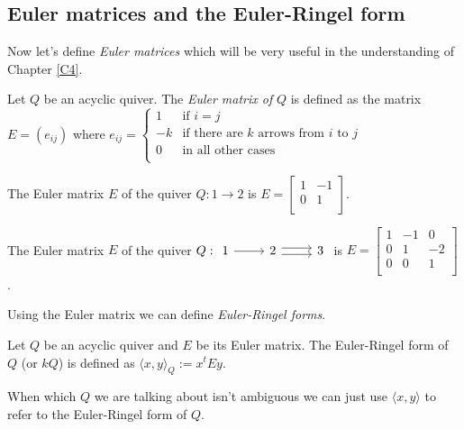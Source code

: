 \subsection{Euler matrices and the Euler-Ringel form}
\indent Now let's define \textit{Euler matrices} which will be very useful in the understanding of Chapter \ref{C4}.\\
\begin{definition}
Let $Q$ be an acyclic quiver. The \textit{Euler matrix of } $Q$ is defined as the matrix $E = (e_{ij})$ where $e_{ij} = \begin{cases}
1 & \text{if } i=j\\
-k & \text{if there are }k\text{ arrows from }i\text{ to }j\\
0 & \text{in all other cases}\\
\end{cases}$
\end{definition}
\begin{example}
The Euler matrix $E$ of the quiver $Q:1\to 2$ is $E=\begin{bmatrix}1 & -1\\0 & 1\\\end{bmatrix}$.
\end{example}
\begin{example}
The Euler matrix $E$ of the quiver $Q:\begin{tikzcd}1\arrow[r] & 2\rightdoublearrow & 3\end{tikzcd}$ is $E=\begin{bmatrix}1 & -1 & 0\\0 & 1 & -2 \\0 & 0 & 1\\\end{bmatrix}$.
\end{example}
\indent Using the Euler matrix we can define \textit{Euler-Ringel forms}.\\
\begin{definition}
Let $Q$ be an acyclic quiver and $E$ be its Euler matrix. The Euler-Ringel form of $Q$ (or $kQ$) is defined as $\langle x,y\rangle_Q:=x^tEy$.
\end{definition}
\indent When which $Q$ we are talking about isn't ambiguous we can just use $\langle x,y\rangle$ to refer to the Euler-Ringel form of $Q$.
